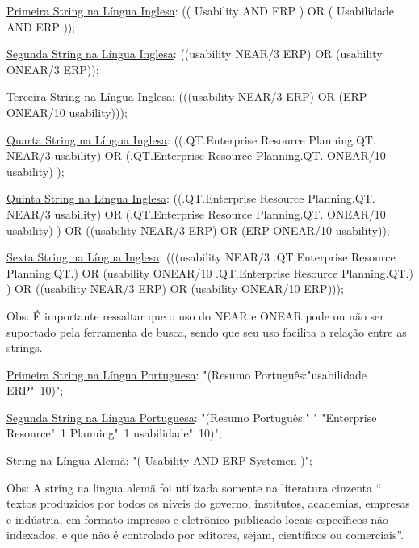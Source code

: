 \noindent \underline{Primeira String na Língua Inglesa}: (( Usability AND ERP ) OR ( Usabilidade AND ERP ));\newline

\noindent \underline{Segunda String na Língua Inglesa}: ((usability NEAR/3 ERP) OR (usability ONEAR/3 ERP));\newline

\noindent \underline{Terceira String na Língua Inglesa}: (((usability NEAR/3 ERP) OR (ERP ONEAR/10 usability)));\newline

\noindent \underline{Quarta String na Língua Inglesa}: ((.QT.Enterprise Resource Planning.QT. NEAR/3 usability)  OR (.QT.Enterprise Resource Planning.QT. ONEAR/10 usability) );\newline

\noindent \underline{Quinta String na Língua Inglesa}: ((.QT.Enterprise Resource Planning.QT. NEAR/3 usability)  OR (.QT.Enterprise Resource Planning.QT. ONEAR/10 usability) ) OR ((usability NEAR/3 ERP) OR (ERP ONEAR/10 usability));\newline

\noindent \underline{Sexta String na Língua Inglesa}: (((usability NEAR/3 .QT.Enterprise Resource Planning.QT.) OR (usability ONEAR/10 .QT.Enterprise Resource Planning.QT.) ) OR ((usability NEAR/3 ERP) OR (usability ONEAR/10 ERP)));\newline

\noindent Obs: É importante ressaltar que o uso do NEAR e ONEAR pode ou não ser suportado pela ferramenta de busca, sendo que seu uso facilita a relação entre as strings.\newline

\noindent \underline{Primeira String na Língua Portuguesa}: "(Resumo Português:"usabilidade ERP"~10)";\newline 

\noindent \underline{Segunda String na Língua Portuguesa}: "(Resumo Português:" " "Enterprise Resource"~1 Planning"~1 usabilidade"~10)";\newline

\noindent \underline{String na Língua Alemã}: "( Usability AND ERP-Systemen )";\newline

\noindent Obs: A string na  lingua  alemã foi utilizada somente na  literatura cinzenta “ textos produzidos por todos os níveis do governo, institutos, academias, empresas e indústria, em formato impresso e eletrônico publicado locais específicos não indexados, e que não é controlado por editores, sejam, científicos ou comerciais”.\newline

